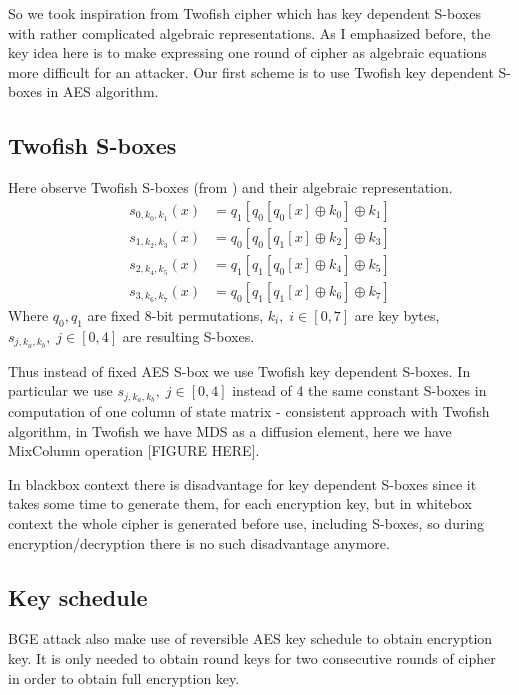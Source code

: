 \documentclass[11pt,oneside,final]{fithesis2}
\begin{document}
    So we took inspiration from Twofish \cite{Schneier98twofish:a} cipher which has key dependent S-boxes with rather
    complicated algebraic representations. As I emphasized before, the key idea here is to make expressing one round of cipher as algebraic equations more difficult for an attacker.
    Our first scheme is to use Twofish key dependent S-boxes in AES algorithm. 

    \subsection{Twofish S-boxes}
    Here observe Twofish S-boxes (from \citep{Schneier98twofish:a}) and their algebraic representation.
    \begin{subequations}\label{eq:twofish_sbox}
    \begin{align}
	s_{0,k_0,k_1}\left(x\right) &= q_1\left[q_0\left[q_0\left[x\right] \oplus k_0 \right] \oplus k_1 \right]\\
	s_{1,k_2,k_3}\left(x\right) &= q_0\left[q_0\left[q_1\left[x\right] \oplus k_2 \right] \oplus k_3 \right]\\
	s_{2,k_4,k_5}\left(x\right) &= q_1\left[q_1\left[q_0\left[x\right] \oplus k_4 \right] \oplus k_5 \right]\\
	s_{3,k_6,k_7}\left(x\right) &= q_0\left[q_1\left[q_1\left[x\right] \oplus k_6 \right] \oplus k_7 \right]
    \end{align}
    \end{subequations}
    Where $q_0, q_1$ are fixed 8-bit permutations, $k_i,\; i \in [0,7]$ are key bytes, $s_{j,k_a,k_b},\; j \in [0,4]$ are resulting S-boxes.

    Thus instead of fixed AES S-box we use Twofish key dependent S-boxes. In particular we use $s_{j,k_a,k_b},\; j \in [0,4]$ instead of 4 the same constant
    S-boxes in computation of one column of state matrix - consistent approach with Twofish algorithm, in Twofish we have MDS as a diffusion element,
    here we have MixColumn operation [FIGURE HERE]. 

    In blackbox context there is disadvantage for key dependent S-boxes since it takes some time to generate them, for each encryption key, but in whitebox context
    the whole cipher is generated before use, including S-boxes, so during encryption/decryption there is no such disadvantage anymore.
   
    \subsection{Key schedule}
    BGE attack also make use of reversible AES key schedule to obtain encryption key. It is only needed to obtain round keys for two consecutive
    rounds of cipher in order to obtain full encryption key.
\end{document}
